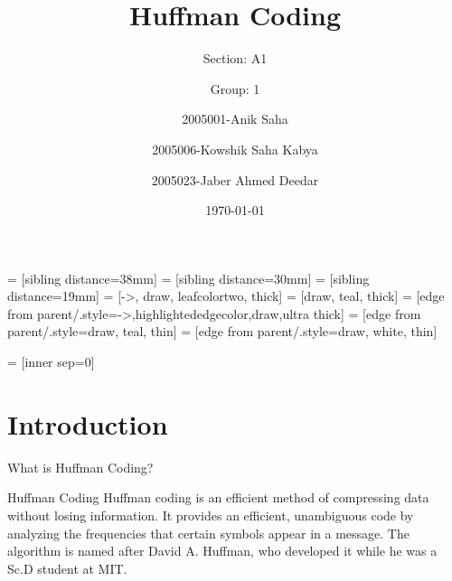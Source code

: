 \documentclass{beamer}
\title{Huffman Coding}
\author[Anik \and Kowshik \and Jaber]{
	Section: A1 \\\and
	Group: 1\\ \and
	2005001-Anik Saha\\ \and 
	2005006-Kowshik Saha Kabya\\ \and 
	2005023-Jaber Ahmed Deedar}
\institute[CSE, BUET]{
	Department of CSE\\ 
	Bangladesh University of Engineering and Technology
}
\date{\today}
\begin{document}
	\maketitle
	
	
	
	 = [sibling distance=38mm]
	 = [sibling distance=30mm]
	 = [sibling distance=19mm]
	 = [->, draw, leafcolortwo, thick]
	 = [draw, teal, thick]
	 = [edge from parent/.style={->,highlightededgecolor,draw,ultra thick}]
	 = [edge from parent/.style={draw, teal, thin}]
	 = [edge from parent/.style={draw, white, thin}]
	
	 = [inner sep=0]
	
	\section{Introduction}
	
	\begin{frame}{What is Huffman Coding?}
		\begin{block}{Huffman Coding}
			Huffman coding is an efficient method of compressing data without losing information. 
			It provides an efficient, unambiguous code by analyzing the frequencies that certain symbols appear in a message. The algorithm is named after David A. Huffman, who developed it while he was a Sc.D student at MIT.
		\end{block}
	\end{frame}
	
\end{document}
